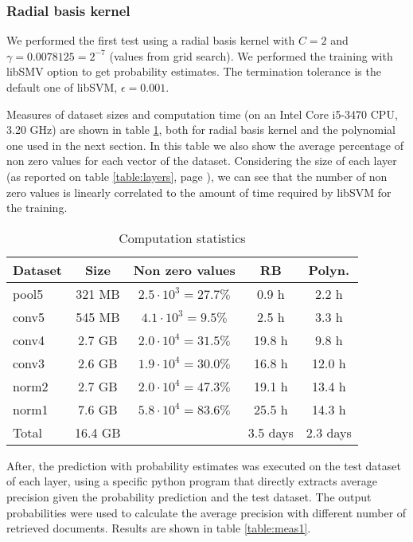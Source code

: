\subsubsection{Radial basis kernel}

We performed the first test using a radial basis kernel with $C=2$ and
$\gamma=0.0078125=2^{-7}$ (values from grid search). We performed the training
with libSMV option to get probability estimates. The termination tolerance is
the default one of libSVM, $\epsilon=0.001$.

Measures of dataset sizes and computation time (on an Intel Core i5-3470 CPU,
3.20 GHz) are shown in table \ref{table:times1}, both for radial basis kernel
and the polynomial one used in the next section. In this table we also show the
average percentage of non zero values for each vector of the dataset.
Considering the size of each layer (as reported on table \ref{table:layers},
page \pageref{table:layers}), we can see that the number of non zero values is
linearly correlated to the amount of time required by libSVM for the training.

\begin{table}[htbp]
\caption{Computation statistics}
\centering
\begin{tabular}{l|cccc}
    Dataset & Size & Non zero values & RB & Polyn. \\
    \midrule                                     
    pool5  & 321 MB & $2.5\cdot10^{3} = 27.7\%$ &  0.9 h & 2.2 h \\
    conv5  & 545 MB & $4.1\cdot10^{3} = 9.5\%$  &  2.5 h & 3.3 h \\
    conv4  & 2.7 GB & $2.0\cdot10^{4} = 31.5\%$ & 19.8 h & 9.8 h \\
    conv3  & 2.6 GB & $1.9\cdot10^{4} = 30.0\%$ & 16.8 h & 12.0 h \\
    norm2  & 2.7 GB & $2.0\cdot10^{4} = 47.3\%$ & 19.1 h & 13.4 h\\
    norm1  & 7.6 GB & $5.8\cdot10^{4} = 83.6\%$ & 25.5 h & 14.3 h\\
    \midrule                                     
    Total & 16.4 GB &  & 3.5 days & 2.3 days \\
\end{tabular}
\label{table:times1}
\end{table}

After, the prediction with probability estimates was executed on the test
dataset of each layer, using a specific python program that directly extracts
average precision given the probability prediction and the test dataset.
The output probabilities were used to calculate the average precision with
different number of retrieved documents. Results are shown in table
\ref{table:meas1}.

